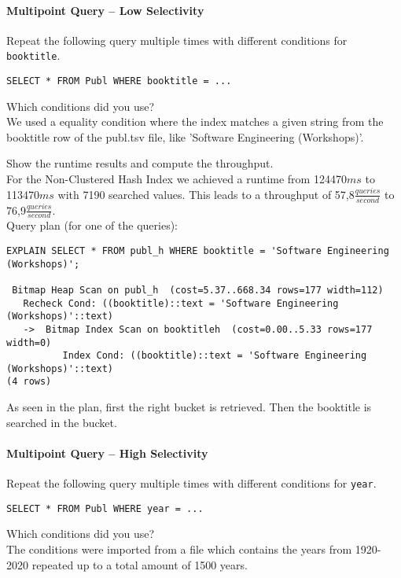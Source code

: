 \documentclass[11pt]{scrartcl}
\begin{document}
\paragraph{Multipoint Query -- Low Selectivity}

Repeat the following query multiple times with different conditions for {\tt booktitle}.

{\small
\begin{verbatim}
SELECT * FROM Publ WHERE booktitle = ...
\end{verbatim}
}

\noindent
Which conditions did you use?\\
We used a equality condition where the index matches a given string from the booktitle row of the publ.tsv file, like 'Software Engineering (Workshops)'.

\smallskip\noindent
Show the runtime results and compute the throughput.\\
For the Non-Clustered Hash Index we achieved a runtime from 124470$ms$ to 113470$ms$ with 7190 searched values.
This leads to a throughput of 57,8$\frac{queries}{second}$ to 76,9$\frac{queries}{second}$.\\

\smallskip\noindent
Query plan (for one of the queries):
\begin{verbatim}
EXPLAIN SELECT * FROM publ_h WHERE booktitle = 'Software Engineering (Workshops)';

 Bitmap Heap Scan on publ_h  (cost=5.37..668.34 rows=177 width=112)
   Recheck Cond: ((booktitle)::text = 'Software Engineering (Workshops)'::text)
   ->  Bitmap Index Scan on booktitleh  (cost=0.00..5.33 rows=177 width=0)
          Index Cond: ((booktitle)::text = 'Software Engineering (Workshops)'::text)
(4 rows)
\end{verbatim}
As seen in the plan, first the right bucket is retrieved. Then the booktitle is searched in the bucket.


\paragraph{Multipoint Query -- High Selectivity}

Repeat the following query multiple times with different conditions for {\tt year}.

{\small
\begin{verbatim}
SELECT * FROM Publ WHERE year = ...
\end{verbatim}
}

\noindent
Which conditions did you use?\\
The conditions were imported from a file which contains the years from 1920-2020 repeated up to a total amount of 1500 years.
\end{document}
